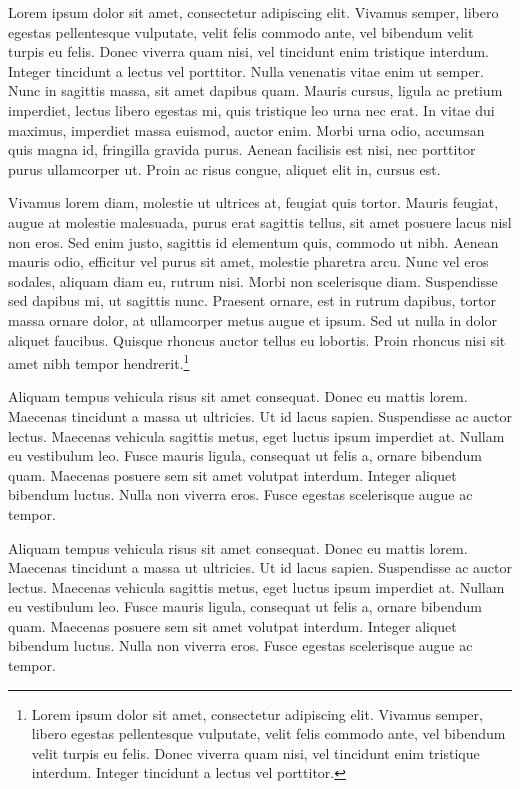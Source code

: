 \label{anex:lorem1}

Lorem ipsum dolor sit amet, consectetur adipiscing elit. Vivamus semper, libero egestas pellentesque vulputate, velit felis commodo ante, vel bibendum velit turpis eu felis. Donec viverra quam nisi, vel tincidunt enim tristique interdum. Integer tincidunt a lectus vel porttitor. Nulla venenatis vitae enim ut semper. Nunc in sagittis massa, sit amet dapibus quam. Mauris cursus, ligula ac pretium imperdiet, lectus libero egestas mi, quis tristique leo urna nec erat. In vitae dui maximus, imperdiet massa euismod, auctor enim. Morbi urna odio, accumsan quis magna id, fringilla gravida purus. Aenean facilisis est nisi, nec porttitor purus ullamcorper ut. Proin ac risus congue, aliquet elit in, cursus est.

Vivamus lorem diam, molestie ut ultrices at, feugiat quis tortor. Mauris feugiat, augue at molestie malesuada, purus erat sagittis tellus, sit amet posuere lacus nisl non eros. Sed enim justo, sagittis id elementum quis, commodo ut nibh. Aenean mauris odio, efficitur vel purus sit amet, molestie pharetra arcu. Nunc vel eros sodales, aliquam diam eu, rutrum nisi. Morbi non scelerisque diam. Suspendisse sed dapibus mi, ut sagittis nunc. Praesent ornare, est in rutrum dapibus, tortor massa ornare dolor, at ullamcorper metus augue et ipsum. Sed ut nulla in dolor aliquet faucibus. Quisque rhoncus auctor tellus eu lobortis. Proin rhoncus nisi sit amet nibh tempor hendrerit.\footnote{Lorem ipsum dolor sit amet, consectetur adipiscing elit. Vivamus semper, libero egestas pellentesque vulputate, velit felis commodo ante, vel bibendum velit turpis eu felis. Donec viverra quam nisi, vel tincidunt enim tristique interdum. Integer tincidunt a lectus vel porttitor.}


\label{anex:lorem2}

Aliquam tempus vehicula risus sit amet consequat. Donec eu mattis lorem. Maecenas tincidunt a massa ut ultricies. Ut id lacus sapien. Suspendisse ac auctor lectus. Maecenas vehicula sagittis metus, eget luctus ipsum imperdiet at. Nullam eu vestibulum leo. Fusce mauris ligula, consequat ut felis a, ornare bibendum quam. Maecenas posuere sem sit amet volutpat interdum. Integer aliquet bibendum luctus. Nulla non viverra eros. Fusce egestas scelerisque augue ac tempor.


Aliquam tempus vehicula risus sit amet consequat. Donec eu mattis lorem. Maecenas tincidunt a massa ut ultricies. Ut id lacus sapien. Suspendisse ac auctor lectus. Maecenas vehicula sagittis metus, eget luctus ipsum imperdiet at. Nullam eu vestibulum leo. Fusce mauris ligula, consequat ut felis a, ornare bibendum quam. Maecenas posuere sem sit amet volutpat interdum. Integer aliquet bibendum luctus. Nulla non viverra eros. Fusce egestas scelerisque augue ac tempor.


